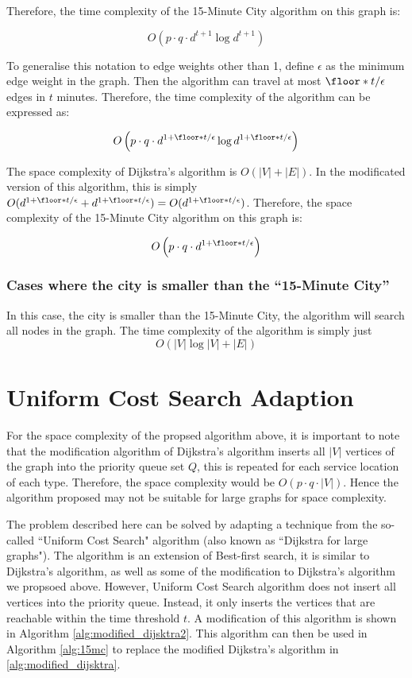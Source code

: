 Therefore, the time complexity of the 15-Minute City algorithm on this graph is:

$$O\left(p\cdot q\cdot d^{t+1}\log d^{t+1}\right)$$

To generalise this notation to edge weights other than 1, define $\epsilon$ as the minimum edge weight in the graph. Then the algorithm can travel at most $\floor*{t/\epsilon}$ edges in $t$ minutes. Therefore, the time complexity of the algorithm can be expressed as:

$$O\left(p\cdot q\cdot d^{1+\floor*{t/\epsilon}}\log d^{1+\floor*{t/\epsilon}}\right)$$

The space complexity of Dijkstra's algorithm is $O(|V|+|E|)$. In the modificated version of this algorithm, this is simply $O(d^{1+\floor*{t/\epsilon}}+d^{1+\floor*{t/\epsilon}}) = O(d^{1+\floor*{t/\epsilon}})$. Therefore, the space complexity of the 15-Minute City algorithm on this graph is:

$$O\left(p\cdot q\cdot d^{1+\floor*{t/\epsilon}}\right)$$

\subsubsection{Cases where the city is smaller than the ``15-Minute City''}

In this case, the city is smaller than the 15-Minute City, the algorithm will search all nodes in the graph. The time complexity of the algorithm is simply just $$O(|V|\log |V|+|E|)$$

\section{Uniform Cost Search Adaption}

For the space complexity of the propsed algorithm above, it is important to note that the modification algorithm of Dijkstra's algorithm inserts all $|V|$ vertices of the graph into the priority queue set $Q$, this is repeated for each service location of each type. Therefore, the space complexity would be $O(p\cdot q\cdot |V|)$. Hence the algorithm proposed may not be suitable for large graphs for space complexity.

The problem described here can be solved by adapting a technique from the so-called ``Uniform Cost Search" algorithm (also known as ``Dijkstra for large graphs"). The algorithm is an extension of Best-first search, it is similar to Dijkstra's algorithm, as well as some of the modification to Dijkstra's algorithm we propsoed above. However, Uniform Cost Search algorithm does not insert all vertices into the priority queue. Instead, it only inserts the vertices that are reachable within the time threshold $t$. A modification of this algorithm is shown in Algorithm \ref{alg:modified_dijsktra2}. This algorithm can then be used in Algorithm \ref{alg:15mc} to replace the modified Dijkstra's algorithm in \ref{alg:modified_dijsktra}.

